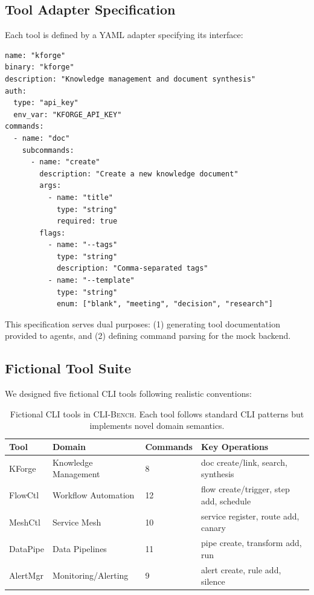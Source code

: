 \documentclass{article}
\newcommand{\clibench}{\textsc{CLI-Bench}}
\begin{document}
\subsection{Tool Adapter Specification}

Each tool is defined by a YAML adapter specifying its interface:

\begin{verbatim}
name: "kforge"
binary: "kforge"
description: "Knowledge management and document synthesis"
auth:
  type: "api_key"
  env_var: "KFORGE_API_KEY"
commands:
  - name: "doc"
    subcommands:
      - name: "create"
        description: "Create a new knowledge document"
        args:
          - name: "title"
            type: "string"
            required: true
        flags:
          - name: "--tags"
            type: "string"
            description: "Comma-separated tags"
          - name: "--template"
            type: "string"
            enum: ["blank", "meeting", "decision", "research"]
\end{verbatim}

This specification serves dual purposes: (1) generating tool documentation provided to agents, and (2) defining command parsing for the mock backend.

\subsection{Fictional Tool Suite}

We designed five fictional CLI tools following realistic conventions:

\begin{table}[h]
\centering
\caption{Fictional CLI tools in \clibench{}. Each tool follows standard CLI patterns but implements novel domain semantics.}
\label{tab:fictional-tools}
\small
\begin{tabular}{llll}
\toprule
\textbf{Tool} & \textbf{Domain} & \textbf{Commands} & \textbf{Key Operations} \\
\midrule
KForge & Knowledge Management & 8 & doc create/link, search, synthesis \\
FlowCtl & Workflow Automation & 12 & flow create/trigger, step add, schedule \\
MeshCtl & Service Mesh & 10 & service register, route add, canary \\
DataPipe & Data Pipelines & 11 & pipe create, transform add, run \\
AlertMgr & Monitoring/Alerting & 9 & alert create, rule add, silence \\
\bottomrule
\end{tabular}
\end{table}
\end{document}
